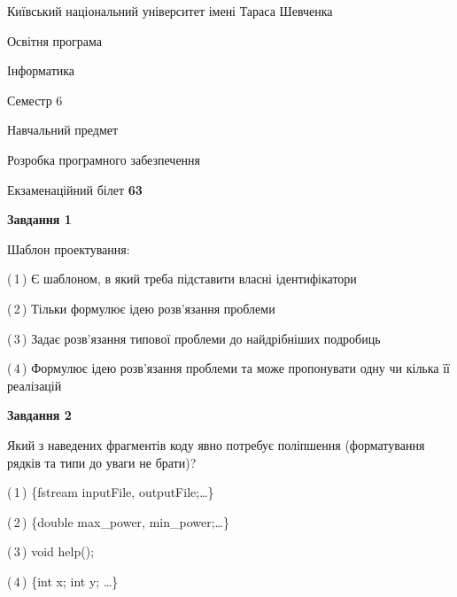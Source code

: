 \documentclass[10pt, ukrainian]{article}
\begin{document}
{{\begin {small}\par
{ \center  Київський національний університет імені Тараса Шевченка \par}
{\parbox {5 cm}{Освітня програма \hfill}{\parbox {7 cm}{Інформатика \hfill}}\parbox {6 cm}{\hfill Семестр 6}}\par
{\parbox {5 cm} {Навчальний предмет \hfill}\parbox {7 cm}{Розробка програмного забезпечення \hfill}\parbox {6cm}{\hfill}\par}\vspace{-7pt} \end{small}}{\center Екзаменаційний білет \No \textbf
{ 63 }\par}}
{
\begin {large}
{\begin {center}\textbf{Завдання 1}\end {center}}\par
Шаблон проектування:\par
\vspace{2mm}



(\,1\,) Є шаблоном, в який треба підставити власні ідентифікатори%



(\,2\,) Тільки формулює ідею розв'язання проблеми%



(\,3\,) Задає розв'язання типової проблеми до найдрібніших подробиць%



(\,4\,) Формулює ідею розв'язання проблеми та може пропонувати одну чи кілька її реалізацій%


{\begin {center}\textbf{Завдання 2}\end {center}}\par
Який з наведених фрагментів коду явно потребує поліпшення (форматування рядків та типи до уваги не брати)?\par
\vspace{2mm}



(\,1\,) \{fstream inputFile, outputFile;…\} %



(\,2\,) \{double max\_power, min\_power;…\} %



(\,3\,) void help();%



(\,4\,) \{int x; int y; …\}%



\end{large}}
\end{document}
